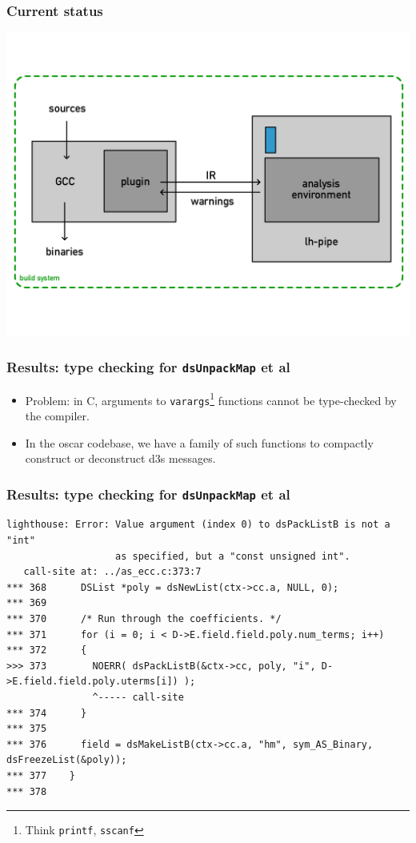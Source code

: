 \documentclass{beamer}
\begin{document}
\frame
{
  \frametitle{Current status}

  \includegraphics[width=1.0\textwidth]{arch-current.png}
}

\frame
{
  \frametitle{Results: type checking for \texttt{dsUnpackMap} et al}
  \begin{itemize}
    \item<1-> Problem: in C, arguments to \texttt{varargs}\footnote{Think \texttt{printf}, \texttt{sscanf}}
              functions cannot be type-checked by the compiler.
    \item<2-> In the oscar codebase, we have a family of such functions
              to compactly construct or deconstruct d3s messages.
  \end{itemize}
  
}

\begin{frame}[fragile]
  \frametitle{Results: type checking for \texttt{dsUnpackMap} et al}
\tiny \begin{verbatim}
lighthouse: Error: Value argument (index 0) to dsPackListB is not a "int"
                   as specified, but a "const unsigned int".
   call-site at: ../as_ecc.c:373:7
*** 368      DSList *poly = dsNewList(ctx->cc.a, NULL, 0);
*** 369    
*** 370      /* Run through the coefficients. */
*** 371      for (i = 0; i < D->E.field.field.poly.num_terms; i++)
*** 372      {
>>> 373        NOERR( dsPackListB(&ctx->cc, poly, "i", D->E.field.field.poly.uterms[i]) );
               ^----- call-site
*** 374      }
*** 375  
*** 376      field = dsMakeListB(ctx->cc.a, "hm", sym_AS_Binary, dsFreezeList(&poly));
*** 377    }
*** 378  
\end{verbatim}
\end{frame}
\end{document}
